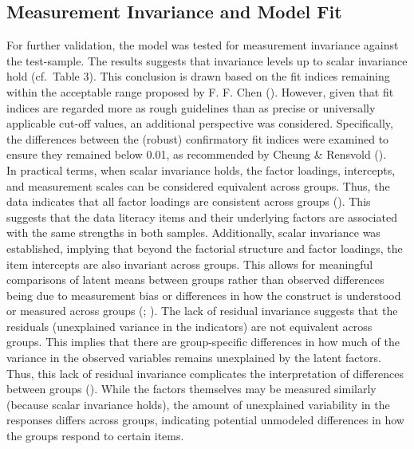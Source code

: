 \documentclass[
  12pt,
  a4paper,
  twoside]{article}
\begin{document}
\subsection{Measurement Invariance and Model Fit}\label{measurement-invariance-and-model-fit}

For further validation, the model was tested for measurement invariance against the test-sample.
The results suggests that invariance levels up to scalar invariance hold (cf.~Table 3).
This conclusion is drawn based on the fit indices remaining within the acceptable range proposed by F. F. Chen ().
However, given that fit indices are regarded more as rough guidelines than as precise or universally applicable cut-off values, an additional perspective was considered.
Specifically, the differences between the (robust) confirmatory fit indices were examined to ensure they remained below 0.01, as recommended by Cheung \& Rensvold ().\\
In practical terms, when scalar invariance holds, the factor loadings, intercepts, and measurement scales can be considered equivalent across groups.
Thus, the data indicates that all factor loadings are consistent across groups ().
This suggests that the data literacy items and their underlying factors are associated with the same strengths in both samples. Additionally, scalar invariance was established, implying that beyond the factorial structure and factor loadings, the item intercepts are also invariant across groups.
This allows for meaningful comparisons of latent means between groups rather than observed differences being due to measurement bias or differences in how the construct is understood or measured across groups (; ).
The lack of residual invariance suggests that the residuals (unexplained variance in the indicators) are not equivalent across groups. This implies that there are group-specific differences in how much of the variance in the observed variables remains unexplained by the latent factors. Thus, this lack of residual invariance complicates the interpretation of differences between groups (). While the factors themselves may be measured similarly (because scalar invariance holds), the amount of unexplained variability in the responses differs across groups, indicating potential unmodeled differences in how the groups respond to certain items.
\end{document}
